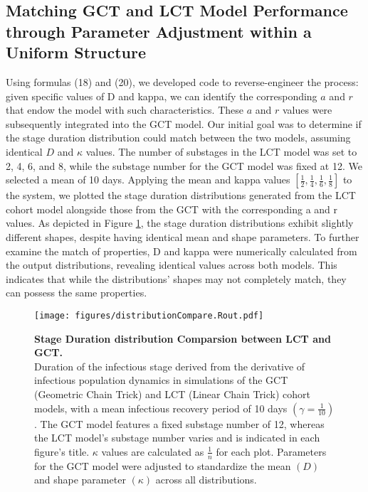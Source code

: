 \documentclass[12pt]{article}
\begin{document}
\subsection{Matching GCT and LCT Model Performance through Parameter Adjustment within a Uniform Structure}

Using formulas (18) and (20), we developed code to reverse-engineer the process: given specific values of D and kappa, we can identify the corresponding $a$ and $r$ that endow the model with such characteristics. These $a$ and $r$ values were subsequently integrated into the GCT model. Our initial goal was to determine if the stage duration distribution could match between the two models, assuming identical $D$ and $\kappa$ values. The number of substages in the LCT model was set to 2, 4, 6, and 8, while the substage number for the GCT model was fixed at 12. We selected a mean of 10 days. Applying the mean and kappa values $\left[ \frac{1}{2}, \frac{1}{4}, \frac{1}{6}, \frac{1}{8} \right]$ to the system, we plotted the stage duration distributions generated from the LCT cohort model alongside those from the GCT with the corresponding a and r values. As depicted in Figure \ref{distributionCompare}, the stage duration distributions exhibit slightly different shapes, despite having identical mean and shape parameters. To further examine the match of properties, D and kappa were numerically calculated from the output distributions, revealing identical values across both models. This indicates that while the distributions' shapes may not completely match, they can possess the same properties.

\begin{figure}[h!]
    \centering
    \texttt{[image: figures/distributionCompare.Rout.pdf]}
    \caption{\textbf{Stage Duration distribution Comparsion between LCT and GCT.} \\ Duration of the infectious stage derived from the derivative of infectious population dynamics in simulations of the GCT (Geometric Chain Trick) and LCT (Linear Chain Trick) cohort models, with a mean infectious recovery period of 10 days $(\gamma = \frac{1}{10})$. The GCT model features a fixed substage number of 12, whereas the LCT model's substage number varies and is indicated in each figure's title. $\kappa$ values are calculated as $\frac{1}{n}$ for each plot. Parameters for the GCT model were adjusted to standardize the mean $(D)$ and shape parameter $(\kappa)$ across all distributions.}
    \label{distributionCompare}
\end{figure}
\end{document}
